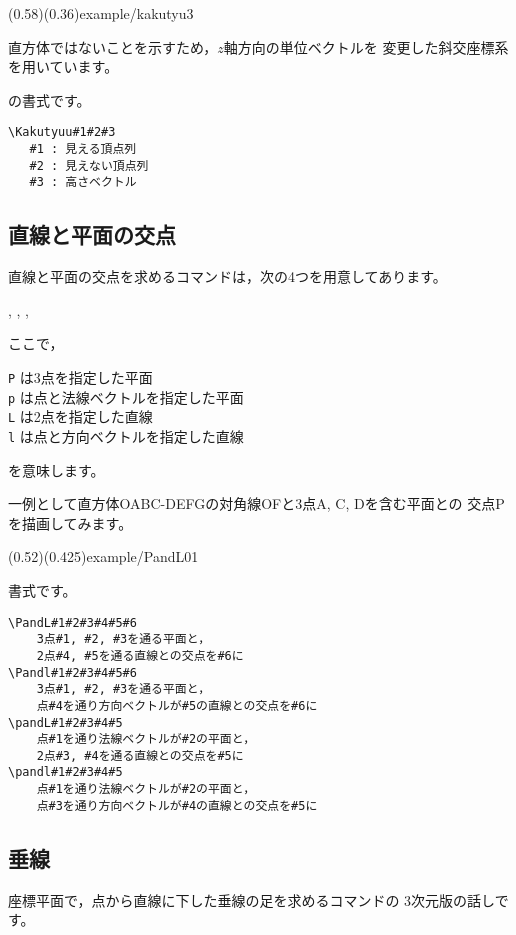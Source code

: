 \showexample[角柱](0.58)(0.36){example/kakutyu3}

直方体ではないことを示すため，$z$軸方向の単位ベクトルを
変更した斜交座標系を用いています。

の書式です。
\begin{boxnote}
\begin{verbatim}
\Kakutyuu#1#2#3
   #1 : 見える頂点列
   #2 : 見えない頂点列
   #3 : 高さベクトル
\end{verbatim}
\end{boxnote}



\subsection{直線と平面の交点}
直線と平面の交点を求めるコマンドは，次の4つを用意してあります。
\begin{jquote}
, , , 
\end{jquote}
ここで，
\begin{jquote}
\texttt P は3点を指定した平面\\
\texttt p は点と法線ベクトルを指定した平面\\
\texttt L は2点を指定した直線\\
\texttt l は点と方向ベクトルを指定した直線
\end{jquote}
を意味します。

一例として直方体OABC-DEFGの対角線OFと3点A, C, Dを含む平面との
交点Pを描画してみます。


\showexample[直線と平面](0.52)(0.425){example/PandL01}

書式です。
\begin{boxnote}
\begin{verbatim}
\PandL#1#2#3#4#5#6
    3点#1, #2, #3を通る平面と，
    2点#4, #5を通る直線との交点を#6に
\Pandl#1#2#3#4#5#6
    3点#1, #2, #3を通る平面と，
    点#4を通り方向ベクトルが#5の直線との交点を#6に
\pandL#1#2#3#4#5
    点#1を通り法線ベクトルが#2の平面と，
    2点#3, #4を通る直線との交点を#5に
\pandl#1#2#3#4#5
    点#1を通り法線ベクトルが#2の平面と，
    点#3を通り方向ベクトルが#4の直線との交点を#5に
\end{verbatim}
\end{boxnote}


\subsection{垂線}
座標平面で，点から直線に下した垂線の足を求めるコマンドの
3次元版の話しです。

